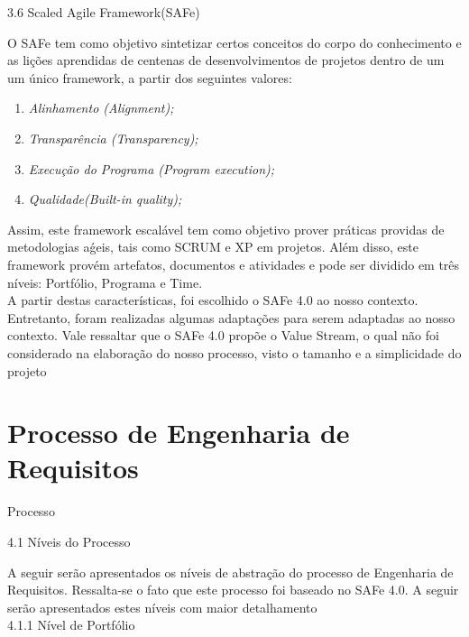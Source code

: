 {\large{3.6 Scaled Agile Framework(SAFe)\\}}

\tab O SAFe  tem como objetivo sintetizar certos conceitos do corpo do conhecimento e as lições aprendidas de centenas de desenvolvimentos de projetos  dentro de um um único framework, a partir dos seguintes valores:\\

\begin{enumerate}
	\item \textsl{Alinhamento (Alignment);}
	\item \textsl{Transparência (Transparency);}
	\item \textsl{Execução do Programa (Program execution);}
	\item \textsl{Qualidade(Built-in quality);}
\end{enumerate}

\tab Assim, este framework escalável tem como objetivo prover práticas providas de metodologias aǵeis, tais como SCRUM e XP em projetos. Além disso, este framework provém artefatos, documentos e atividades e pode ser dividido em três níveis: Portfólio, Programa e Time.\\
\tab A partir destas características, foi escolhido o SAFe 4.0 ao nosso contexto. Entretanto, foram realizadas algumas adaptações para serem adaptadas ao nosso contexto. Vale ressaltar que o SAFe 4.0 propõe o Value Stream, o qual não foi considerado na elaboração do nosso processo, visto  o tamanho e a simplicidade do projeto \\


\section{Processo de Engenharia de Requisitos}
\label{sec:nova_sess_o}



{\large{Processo\\}}




{\large{4.1 Níveis do Processo\\}}

\tab A seguir serão apresentados os níveis de abstração do processo de Engenharia de Requisitos. Ressalta-se o fato que este processo foi baseado no SAFe 4.0. A seguir serão apresentados estes níveis com maior detalhamento\\


{\large{4.1.1 Nível de Portfólio\\}}

